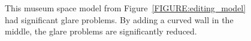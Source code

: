\documentclass[10pt,twocolumn,letterpaper]{article}
\begin{document}
\begin{figure}[t]

\caption{This museum space model from Figure~\ref{FIGURE:editing_model} had
  significant glare problems.  By adding a curved wall in the middle,
  the glare problems are significantly reduced.}
\vspace{-0.15in}
\label{FIGURE:museum2}
\end{figure}
\end{document}
